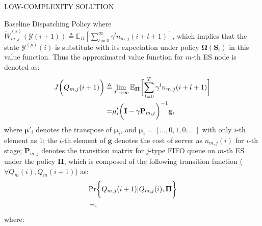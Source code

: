 \documentclass[10pt, conference, letterpaper]{IEEEtran}
\newcommand{\mat}{\mathbf}
\newcommand{\define}{\triangleq}
\renewcommand{\vec}{\mathbf}
\DeclarePairedDelimiter{\Paren}{\bigg(}{\bigg)}
\DeclarePairedDelimiter{\Bracket}{\bigg[}{\bigg]}
\DeclarePairedDelimiter{\Brace}{\bigg\{}{\bigg\}}
\newcommand{\apSet}{\mathcal{K}}
\newcommand{\Stat}{\mathbf{S}}
\newcommand{\Obsv}{\mathcal{Y}}
\newcommand{\Policy}{\mathbf{\Omega}}
\begin{document}
\begin{section}{LOW-COMPLEXITY SOLUTION}
\begin{subsection}{Baseline Dispatching Policy}
            where $\tilde{W}^{(s)}_{m,j}(\Obsv(i+1)) \define \mathbb{E}_{\Pi}[\sum_{l=0}^{\infty} \gamma^{l} n_{m,j}(i+l+1)]$, which implies that the state $\Obsv^{(p)}(i)$ is substitute with its expectation under policy $\Policy(\Stat_i)$ in this value function.
            Thus the approximated value function for $m$-th ES node is denoted as:
            \begin{align}
                J\Paren{Q_{m,j}(i+1)} \define& \lim_{T\to\infty}
                    \mathbb{E}_{\vec{\Pi}} \Bracket{\sum_{l=0}^{T} \gamma^{l} n_{m,j}(i+l+1)}
                \nonumber\\
                =& \vec{\mu}'_i \Paren{ \mat{I}-\gamma\mat{P}_{m,j} }^{-1} \vec{g},
            \end{align}
            where $\vec{\mu}'_i$ denotes the transpose of $\vec{\mu}_i$, and $\vec{\mu}_i = [\dots,0,1,0,\dots]$ with only $i$-th element as $1$; the $i$-th element of $\vec{g}$ denotes the cost of server as $n_{m,j}(i)$ for $i$-th stage; $\mat{P}_{m,j}$ denotes the transition matrix for $j$-type FIFO queue on $m$-th ES under the policy $\vec{\Pi}$, which is composed of the following transition function ($\forall Q_m(i),Q_m(i+1)$) as:
            \begin{align}
                &\Pr \Brace{Q_{m,j}(i+1)|Q_{m,j}(i),\vec{\Pi}}
                \nonumber\\
                &=,
            \end{align}
            where:
        \end{subsection}


\end{section}
\end{document}
